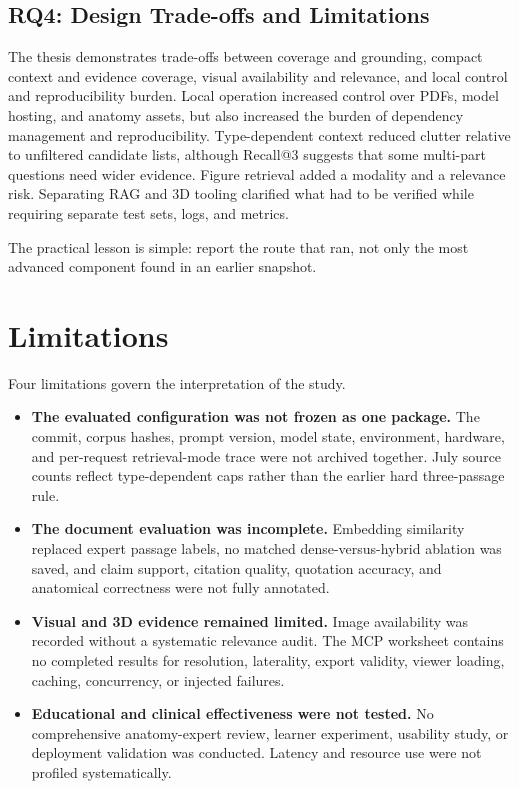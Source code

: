 \subsection{RQ4: Design Trade-offs and Limitations}
\label{sec:conclusion-rq4}

The thesis demonstrates trade-offs between coverage and grounding, compact context and evidence coverage, visual availability and relevance, and local control and reproducibility burden. Local operation increased control over PDFs, model hosting, and anatomy assets, but also increased the burden of dependency management and reproducibility. Type-dependent context reduced clutter relative to unfiltered candidate lists, although Recall@3 suggests that some multi-part questions need wider evidence. Figure retrieval added a modality and a relevance risk. Separating RAG and 3D tooling clarified what had to be verified while requiring separate test sets, logs, and metrics.

The practical lesson is simple: report the route that ran, not only the most advanced component found in an earlier snapshot.

\section{Limitations}
\label{sec:conclusion-limitations}

Four limitations govern the interpretation of the study.

\begin{itemize}
  \item \textbf{The evaluated configuration was not frozen as one package.} The commit, corpus hashes, prompt version, model state, environment, hardware, and per-request retrieval-mode trace were not archived together. July source counts reflect type-dependent caps rather than the earlier hard three-passage rule.
  \item \textbf{The document evaluation was incomplete.} Embedding similarity replaced expert passage labels, no matched dense-versus-hybrid ablation was saved, and claim support, citation quality, quotation accuracy, and anatomical correctness were not fully annotated.
  \item \textbf{Visual and 3D evidence remained limited.} Image availability was recorded without a systematic relevance audit. The MCP worksheet contains no completed results for resolution, laterality, export validity, viewer loading, caching, concurrency, or injected failures.
  \item \textbf{Educational and clinical effectiveness were not tested.} No comprehensive anatomy-expert review, learner experiment, usability study, or deployment validation was conducted. Latency and resource use were not profiled systematically.
\end{itemize}

